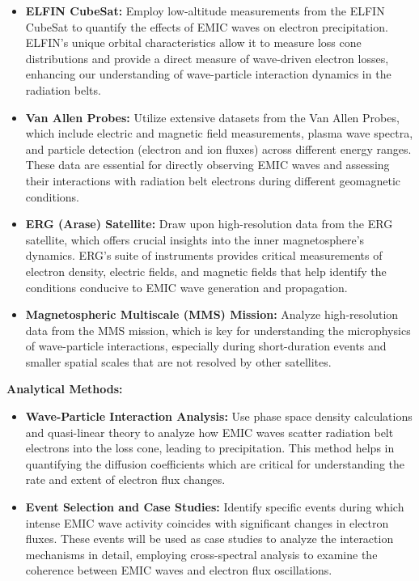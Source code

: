 \documentclass[
  letterpaper,
  DIV=11,
  numbers=noendperiod]{scrartcl}
\begin{document}
\begin{itemize}
\item
  \textbf{ELFIN CubeSat:} Employ low-altitude measurements from the ELFIN CubeSat to quantify the effects of EMIC waves on electron precipitation. ELFIN's unique orbital characteristics allow it to measure loss cone distributions and provide a direct measure of wave-driven electron losses, enhancing our understanding of wave-particle interaction dynamics in the radiation belts.
\item
  \textbf{Van Allen Probes:} Utilize extensive datasets from the Van Allen Probes, which include electric and magnetic field measurements, plasma wave spectra, and particle detection (electron and ion fluxes) across different energy ranges. These data are essential for directly observing EMIC waves and assessing their interactions with radiation belt electrons during different geomagnetic conditions.
\item
  \textbf{ERG (Arase) Satellite:} Draw upon high-resolution data from the ERG satellite, which offers crucial insights into the inner magnetosphere's dynamics. ERG's suite of instruments provides critical measurements of electron density, electric fields, and magnetic fields that help identify the conditions conducive to EMIC wave generation and propagation.
\item
  \textbf{Magnetospheric Multiscale (MMS) Mission:} Analyze high-resolution data from the MMS mission, which is key for understanding the microphysics of wave-particle interactions, especially during short-duration events and smaller spatial scales that are not resolved by other satellites.
\end{itemize}

\textbf{Analytical Methods:}

\begin{itemize}
\item
  \textbf{Wave-Particle Interaction Analysis:} Use phase space density calculations and quasi-linear theory to analyze how EMIC waves scatter radiation belt electrons into the loss cone, leading to precipitation. This method helps in quantifying the diffusion coefficients which are critical for understanding the rate and extent of electron flux changes.
\item
  \textbf{Event Selection and Case Studies:} Identify specific events during which intense EMIC wave activity coincides with significant changes in electron fluxes. These events will be used as case studies to analyze the interaction mechanisms in detail, employing cross-spectral analysis to examine the coherence between EMIC waves and electron flux oscillations.
\end{itemize}
\end{document}
